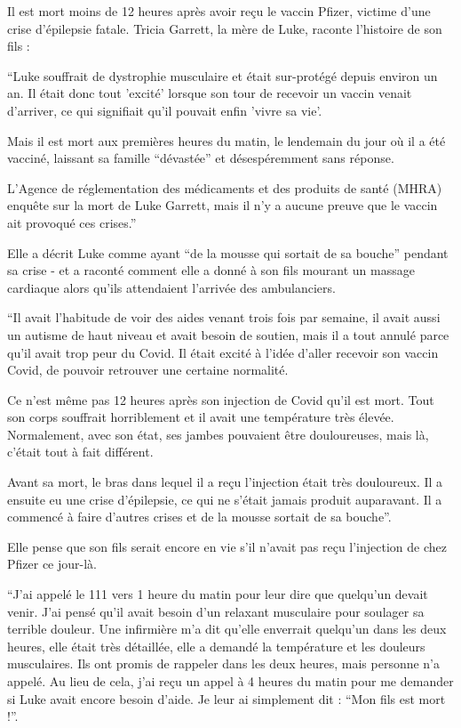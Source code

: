 Il est mort moins de 12 heures après avoir reçu le vaccin Pfizer, victime d'une
crise d'épilepsie fatale. Tricia Garrett, la mère de Luke, raconte l'histoire de
son fils :

“Luke souffrait de dystrophie musculaire et était sur-protégé depuis environ un
an. Il était donc tout 'excité' lorsque son tour de recevoir un vaccin venait
d'arriver, ce qui signifiait qu'il pouvait enfin 'vivre sa vie'.

Mais il est mort aux premières heures du matin, le lendemain du jour où il a été
vacciné, laissant sa famille “dévastée” et désespéremment sans réponse.

L'Agence de réglementation des médicaments et des produits de santé (MHRA)
enquête sur la mort de Luke Garrett, mais il n'y a aucune preuve que le vaccin
ait provoqué ces crises.”

Elle a décrit Luke comme ayant “de la mousse qui sortait de sa bouche” pendant
sa crise - et a raconté comment elle a donné à son fils mourant un massage
cardiaque alors qu'ils attendaient l'arrivée des ambulanciers.

“Il avait l'habitude de voir des aides venant trois fois par semaine, il avait
aussi un autisme de haut niveau et avait besoin de soutien, mais il a tout
annulé parce qu'il avait trop peur du Covid. Il était excité à l'idée d'aller
recevoir son vaccin Covid, de pouvoir retrouver une certaine normalité.

Ce n'est même pas 12 heures après son injection de Covid qu'il est mort. Tout
son corps souffrait horriblement et il avait une température très
élevée. Normalement, avec son état, ses jambes pouvaient être douloureuses, mais
là, c'était tout à fait différent.

Avant sa mort, le bras dans lequel il a reçu l'injection était très
douloureux. Il a ensuite eu une crise d'épilepsie, ce qui ne s'était jamais
produit auparavant. Il a commencé à faire d'autres crises et de la mousse
sortait de sa bouche”.

Elle pense que son fils serait encore en vie s'il n'avait pas reçu l'injection
de chez Pfizer ce jour-là.

“J'ai appelé le 111 vers 1 heure du matin pour leur dire que quelqu'un devait
venir. J'ai pensé qu'il avait besoin d'un relaxant musculaire pour soulager sa
terrible douleur. Une infirmière m'a dit qu'elle enverrait quelqu'un dans les
deux heures, elle était très détaillée, elle a demandé la température et les
douleurs musculaires. Ils ont promis de rappeler dans les deux heures, mais
personne n'a appelé. Au lieu de cela, j'ai reçu un appel à 4 heures du matin
pour me demander si Luke avait encore besoin d'aide. Je leur ai simplement dit :
“Mon fils est mort !”.

